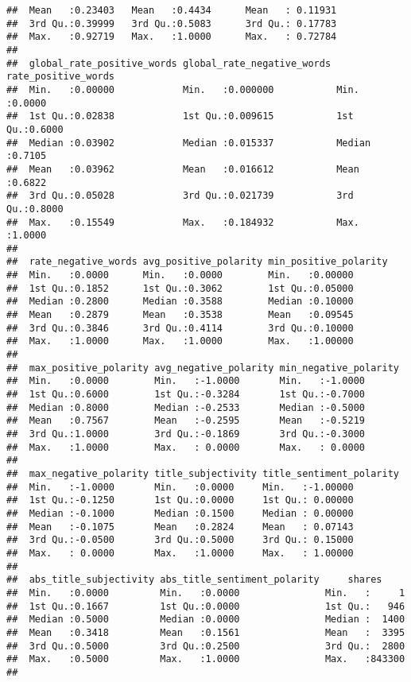 \documentclass[]{article}
\begin{document}
\begin{verbatim}
##  Mean   :0.23403   Mean   :0.4434      Mean   : 0.11931         
##  3rd Qu.:0.39999   3rd Qu.:0.5083      3rd Qu.: 0.17783         
##  Max.   :0.92719   Max.   :1.0000      Max.   : 0.72784         
##                                                                 
##  global_rate_positive_words global_rate_negative_words rate_positive_words
##  Min.   :0.00000            Min.   :0.000000           Min.   :0.0000     
##  1st Qu.:0.02838            1st Qu.:0.009615           1st Qu.:0.6000     
##  Median :0.03902            Median :0.015337           Median :0.7105     
##  Mean   :0.03962            Mean   :0.016612           Mean   :0.6822     
##  3rd Qu.:0.05028            3rd Qu.:0.021739           3rd Qu.:0.8000     
##  Max.   :0.15549            Max.   :0.184932           Max.   :1.0000     
##                                                                           
##  rate_negative_words avg_positive_polarity min_positive_polarity
##  Min.   :0.0000      Min.   :0.0000        Min.   :0.00000      
##  1st Qu.:0.1852      1st Qu.:0.3062        1st Qu.:0.05000      
##  Median :0.2800      Median :0.3588        Median :0.10000      
##  Mean   :0.2879      Mean   :0.3538        Mean   :0.09545      
##  3rd Qu.:0.3846      3rd Qu.:0.4114        3rd Qu.:0.10000      
##  Max.   :1.0000      Max.   :1.0000        Max.   :1.00000      
##                                                                 
##  max_positive_polarity avg_negative_polarity min_negative_polarity
##  Min.   :0.0000        Min.   :-1.0000       Min.   :-1.0000      
##  1st Qu.:0.6000        1st Qu.:-0.3284       1st Qu.:-0.7000      
##  Median :0.8000        Median :-0.2533       Median :-0.5000      
##  Mean   :0.7567        Mean   :-0.2595       Mean   :-0.5219      
##  3rd Qu.:1.0000        3rd Qu.:-0.1869       3rd Qu.:-0.3000      
##  Max.   :1.0000        Max.   : 0.0000       Max.   : 0.0000      
##                                                                   
##  max_negative_polarity title_subjectivity title_sentiment_polarity
##  Min.   :-1.0000       Min.   :0.0000     Min.   :-1.00000        
##  1st Qu.:-0.1250       1st Qu.:0.0000     1st Qu.: 0.00000        
##  Median :-0.1000       Median :0.1500     Median : 0.00000        
##  Mean   :-0.1075       Mean   :0.2824     Mean   : 0.07143        
##  3rd Qu.:-0.0500       3rd Qu.:0.5000     3rd Qu.: 0.15000        
##  Max.   : 0.0000       Max.   :1.0000     Max.   : 1.00000        
##                                                                   
##  abs_title_subjectivity abs_title_sentiment_polarity     shares      
##  Min.   :0.0000         Min.   :0.0000               Min.   :     1  
##  1st Qu.:0.1667         1st Qu.:0.0000               1st Qu.:   946  
##  Median :0.5000         Median :0.0000               Median :  1400  
##  Mean   :0.3418         Mean   :0.1561               Mean   :  3395  
##  3rd Qu.:0.5000         3rd Qu.:0.2500               3rd Qu.:  2800  
##  Max.   :0.5000         Max.   :1.0000               Max.   :843300  
## 
\end{verbatim}
\end{document}
